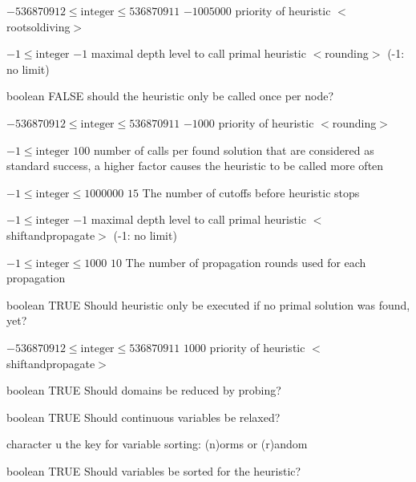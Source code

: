 %
{$-536870912\leq\textrm{integer}\leq536870911$}%
{$-1005000$}%
{priority of heuristic $<$rootsoldiving$>$}%
{}

%
{$-1\leq\textrm{integer}$}%
{$-1$}%
{maximal depth level to call primal heuristic $<$rounding$>$ (-1: no limit)}%
{}

%
{boolean}%
{FALSE}%
{should the heuristic only be called once per node?}%
{}

%
{$-536870912\leq\textrm{integer}\leq536870911$}%
{$-1000$}%
{priority of heuristic $<$rounding$>$}%
{}

%
{$-1\leq\textrm{integer}$}%
{$100$}%
{number of calls per found solution that are considered as standard success, a higher factor causes the heuristic to be called more often}%
{}

%
{$-1\leq\textrm{integer}\leq1000000$}%
{$15$}%
{The number of cutoffs before heuristic stops}%
{}

%
{$-1\leq\textrm{integer}$}%
{$-1$}%
{maximal depth level to call primal heuristic $<$shiftandpropagate$>$ (-1: no limit)}%
{}

%
{$-1\leq\textrm{integer}\leq1000$}%
{$10$}%
{The number of propagation rounds used for each propagation}%
{}

%
{boolean}%
{TRUE}%
{Should heuristic only be executed if no primal solution was found, yet?}%
{}

%
{$-536870912\leq\textrm{integer}\leq536870911$}%
{$1000$}%
{priority of heuristic $<$shiftandpropagate$>$}%
{}

%
{boolean}%
{TRUE}%
{Should domains be reduced by probing?}%
{}

%
{boolean}%
{TRUE}%
{Should continuous variables be relaxed?}%
{}

%
{character}%
{u}%
{the key for variable sorting: (n)orms or (r)andom}%
{}

%
{boolean}%
{TRUE}%
{Should variables be sorted for the heuristic?}%
{}

